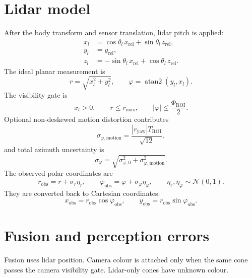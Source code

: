 \documentclass[11pt,a4paper]{article}
\newcommand{\Normal}{\mathcal{N}}
\begin{document}
\section{Lidar model}

After the body transform and sensor translation, lidar pitch is applied:
\begin{align}
  x_l &= \cos\theta_l\,x_{\mathrm{rel}}
       +\sin\theta_l\,z_{\mathrm{rel}},\\
  y_l &= y_{\mathrm{rel}},\\
  z_l &= -\sin\theta_l\,x_{\mathrm{rel}}
       +\cos\theta_l\,z_{\mathrm{rel}}.
\end{align}
The ideal planar measurement is
\begin{equation}
  r=\sqrt{x_l^2+y_l^2},\qquad
  \varphi=\operatorname{atan2}(y_l,x_l).
\end{equation}
The visibility gate is
\begin{equation}
  x_l>0,\qquad r\leq r_{\max},\qquad
  |\varphi|\leq\frac{\Phi_{\mathrm{ROI}}}{2}.
\end{equation}
Optional non-deskewed motion distortion contributes
\begin{equation}
  \sigma_{\varphi,\mathrm{motion}}
  =\frac{|r_{\mathrm{yaw}}|T_{\mathrm{ROI}}}{\sqrt{12}},
\end{equation}
and total azimuth uncertainty is
\begin{equation}
  \sigma_{\varphi}=
  \sqrt{\sigma_{\varphi,0}^2+
  \sigma_{\varphi,\mathrm{motion}}^2}.
\end{equation}
The observed polar coordinates are
\begin{equation}
  r_{\mathrm{obs}}=r+\sigma_r\eta_r,\qquad
  \varphi_{\mathrm{obs}}=\varphi+\sigma_\varphi\eta_\varphi,
  \qquad \eta_r,\eta_\varphi\sim\Normal(0,1).
\end{equation}
They are converted back to Cartesian coordinates:
\begin{equation}
  x_{\mathrm{obs}}=r_{\mathrm{obs}}\cos\varphi_{\mathrm{obs}},
  \qquad
  y_{\mathrm{obs}}=r_{\mathrm{obs}}\sin\varphi_{\mathrm{obs}}.
\end{equation}

\section{Fusion and perception errors}

Fusion uses lidar position. Camera colour is attached only when the same cone
passes the camera visibility gate. Lidar-only cones have unknown colour.
\end{document}
